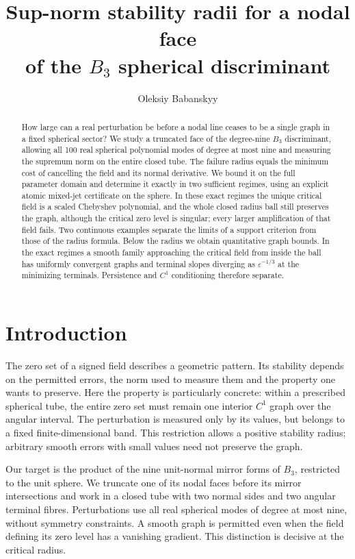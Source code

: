 \documentclass[11pt,a4paper]{article}
\title{Sup-norm stability radii for a nodal face\\of the $B_3$ spherical discriminant}
\author{Oleksiy Babanskyy}
\date{}
\begin{document}
\maketitle

\begin{abstract}
How large can a real perturbation be before a nodal line ceases to be a
single graph in a fixed spherical sector? We study a truncated face of
the degree-nine $B_3$ discriminant, allowing all 100 real spherical
polynomial modes of degree at most nine and measuring the supremum norm
on the entire closed tube. The failure radius equals the minimum cost
of cancelling the field and its normal derivative. We bound it on the
full parameter domain and determine it exactly in two sufficient
regimes, using an explicit atomic mixed-jet certificate on the sphere.
In these exact regimes the unique critical field is a scaled Chebyshev
polynomial, and the whole closed radius ball still preserves the graph,
although the critical zero level is singular; every larger amplification
of that field fails. Two continuous examples separate the limits of a
support criterion from those of the radius formula. Below the radius
we obtain quantitative graph bounds. In the exact regimes a smooth
family approaching the critical field from inside the ball has uniformly convergent graphs and
terminal slopes diverging as $\varepsilon^{-1/3}$ at the minimizing
terminals. Persistence and $C^1$ conditioning therefore separate.
\end{abstract}

\section{Introduction}\label{sec:introduction}

The zero set of a signed field describes a geometric pattern. Its
stability depends on the permitted errors, the norm used to measure
them and the property one wants to preserve. Here the property is
particularly concrete: within a prescribed spherical tube, the entire
zero set must remain one interior $C^1$ graph over the angular interval.
The perturbation is measured only by its values, but belongs to a fixed
finite-dimensional band. This restriction allows a positive stability
radius; arbitrary smooth errors with small values need not preserve
the graph.

Our target is the product of the nine unit-normal mirror forms of
$B_3$, restricted to the unit sphere. We truncate one of its nodal faces
before its mirror intersections and work in a closed tube with two
normal sides and two angular terminal fibres. Perturbations use all
real spherical modes of degree at most nine, without symmetry
constraints. A smooth graph is permitted even when the field defining
its zero level has a vanishing gradient. This distinction is decisive
at the critical radius.
\end{document}
